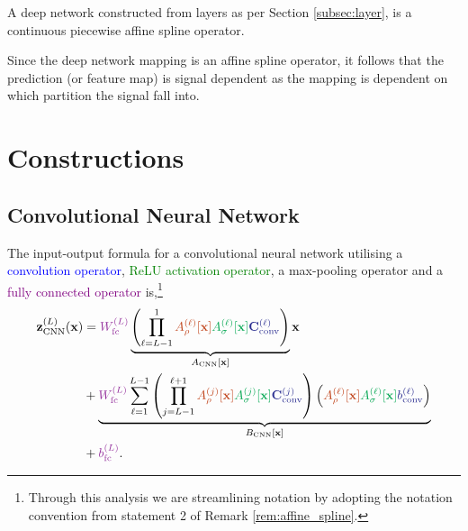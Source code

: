 \begin{corollary}
    A deep network constructed from layers as per Section \ref{subsec:layer}, is a continuous piecewise affine spline operator.
\end{corollary}

\begin{remark}
    Since the deep network mapping is an affine spline operator, it follows that the prediction (or feature map) is signal dependent as the mapping is dependent on which partition the signal fall into. 
\end{remark}

\section{Constructions}\label{sec:constructions}

\subsection{Convolutional Neural Network}\label{subsec:conv_net}

The input-output formula for a convolutional neural network utilising a \textcolor{Blue}{convolution operator}, \textcolor{Green}{ReLU activation operator}, a \textcolor{Bittersweet}{max-pooling operator} and a \textcolor{Purple}{fully connected operator} is,\footnote{Through this analysis we are streamlining notation by adopting the notation convention from statement 2 of Remark \ref{rem:affine_spline}.} 
\begin{align}\label{eq:cnn_formulation}
    \mathbf{z}_{\text{CNN}}^{(L)}(\mathbf{x})&=\textcolor{Purple}{W_{\text{fc}}^{(L)}}\underbrace{\left(\prod_{\ell=L-1}^1\textcolor{Bittersweet}{A_{\rho}^{(\ell)}[\mathbf{x}]}\textcolor{Green}{A_{\sigma}^{(\ell)}[\mathbf{x}]}\textcolor{Blue}{\mathbf{C}_{\text{conv}}^{(\ell)}}\right)}_{A_{\text{CNN}}[\mathbf{x}]}\mathbf{x}\nonumber\\&+\underbrace{\textcolor{Purple}{W_{\text{fc}}^{(L)}}\sum_{\ell=1}^{L-1}\left(\prod_{j=L-1}^{\ell+1}\textcolor{Bittersweet}{A_{\rho}^{(j)}[\mathbf{x}]}\textcolor{Green}{A_{\sigma}^{(j)}[\mathbf{x}]}\textcolor{Blue}{\mathbf{C}_{\text{conv}}^{(j)}}\right)\left(\textcolor{Bittersweet}{A_{\rho}^{(\ell)}[\mathbf{x}]}\textcolor{Green}{A_{\sigma}^{(\ell)}[\mathbf{x}]}\textcolor{Blue}{b_{\text{conv}}^{(\ell)}}\right)}_{B_{\text{CNN}}[\mathbf{x}]}\nonumber\\&+\textcolor{Purple}{b_{\text{fc}}^{(L)}}.
\end{align}

